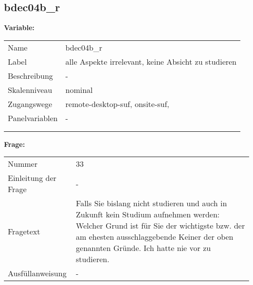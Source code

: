 	
	
	\subsection{bdec04b\_r}
	\label{subSection:bdec04b_r}

	\noindent\textbf{Variable:}\\
		\begin{tabular}{lL{11.3cm}}
			\label{tableVariable:bdec04b_r}
			Name & bdec04b\_r \\
			Label & alle Aspekte irrelevant, keine Absicht zu studieren  \\
			Beschreibung & - \\
			Skalenniveau & nominal \\
			Zugangswege &
				remote-desktop-suf,
				onsite-suf,
 \\
			Panelvariablen & -
			 \\
			 \\
 \\
		\end{tabular}

		\vspace*{1 cm}
		\noindent\textbf{Frage:}\\
		\begin{tabular}{lL{11.3cm}}
			\label{tableQuestion:bdec04b_r}
			Nummer & 33 \\
			Einleitung der Frage & - \\
			Fragetext & Falls Sie bislang nicht studieren und auch in Zukunft kein Studium aufnehmen werden: Welcher Grund ist für Sie der wichtigste bzw. der am ehesten ausschlaggebende
Keiner der oben genannten Gründe. Ich hatte nie vor zu studieren. \\
			Ausfüllanweisung & - \\
		\end{tabular}





